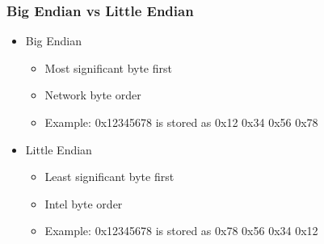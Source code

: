 \begin{frame}
    \frametitle{Big Endian vs Little Endian}
    \begin{itemize}
        \item Big Endian
        \begin{itemize}
            \item Most significant byte first
            \item Network byte order
            \item Example: 0x12345678 is stored as 0x12 0x34 0x56 0x78
        \end{itemize}
        \item Little Endian
        \begin{itemize}
            \item Least significant byte first
            \item Intel byte order
            \item Example: 0x12345678 is stored as 0x78 0x56 0x34 0x12
        \end{itemize}
    \end{itemize}
\end{frame}




